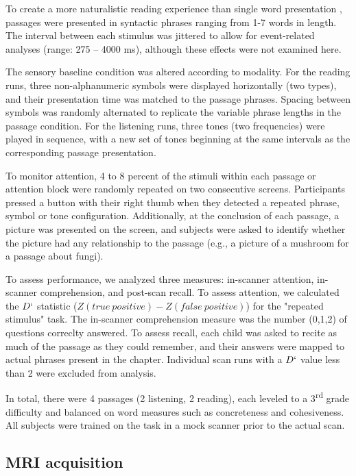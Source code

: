 To create a more naturalistic reading experience than single word presentation \citep{Rayner1986}, passages were presented in syntactic phrases ranging from 1-7 words in length. The interval between each stimulus was jittered to allow for event-related analyses (range: 275 – 4000 ms), although these effects were not examined here.

The sensory baseline condition was altered according to modality. For the reading runs, three non-alphanumeric symbols were displayed horizontally (two types), and their presentation time was matched to the passage phrases. Spacing between symbols was randomly alternated to replicate the variable phrase lengths in the passage condition. For the listening runs, three tones (two frequencies) were played in sequence, with a new set of tones beginning at the same intervals as the corresponding passage presentation. 

To monitor attention, 4 to 8 percent of the stimuli within each passage or attention block were randomly repeated on two consecutive screens.  Participants pressed a button with their right thumb when they detected a repeated phrase, symbol or tone configuration. Additionally, at the conclusion of each passage, a picture was presented on the screen, and subjects were asked to identify whether the picture had any relationship to the passage (e.g., a picture of a mushroom for a passage about fungi). 

To assess performance, we analyzed three measures: in-scanner attention, in-scanner comprehension, and post-scan recall. To assess attention, we calculated the $D`$ statistic ($Z(true\ positive) - Z(false\ positive)$) for the "repeated stimulus" task. The in-scanner comprehension measure was the number (0,1,2) of questions correclty answered. To assess recall, each child was asked to recite as much of the passage as they could remember, and their answers were mapped to actual phrases present in the chapter. Individual scan runs with a $D`$ value less than 2 were excluded from analysis.

In total, there were 4 passages (2 listening, 2 reading), each leveled to a 3\textsuperscript{rd} grade difficulty and balanced on word measures such as concreteness and cohesiveness.  All subjects were trained on the task in a mock scanner prior to the actual scan. 


\subsection{MRI acquisition}

